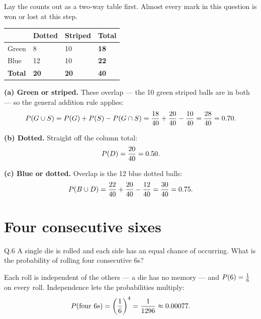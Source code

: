 \begin{solution}
Lay the counts out as a two-way table first. Almost every mark in this question
is won or lost at this step.

\begin{center}
\small\sffamily
\begin{tabular}{@{}l C{2.2cm} C{2.2cm} C{2.2cm}@{}}
\toprule
 & \textbf{Dotted} & \textbf{Striped} & \textbf{Total} \\
\midrule
Green & 8  & 10 & \textbf{18} \\
Blue  & 12 & 10 & \textbf{22} \\
\midrule
\textbf{Total} & \textbf{20} & \textbf{20} & \textbf{40} \\
\bottomrule
\end{tabular}
\end{center}

\textbf{(a) Green or striped.} These overlap --- the 10 green striped balls are
in both --- so the general addition rule applies:
\[
P\!\left(G\cup S\right)=P\!\left(G\right)+P\!\left(S\right)-P\!\left(G\cap S\right)
=\frac{18}{40}+\frac{20}{40}-\frac{10}{40}=\frac{28}{40}=0.70 .
\]

\textbf{(b) Dotted.} Straight off the column total:
\[
P\!\left(D\right)=\frac{20}{40}=0.50 .
\]

\textbf{(c) Blue or dotted.} Overlap is the 12 blue dotted balls:
\[
P\!\left(B\cup D\right)=\frac{22}{40}+\frac{20}{40}-\frac{12}{40}=\frac{30}{40}=0.75 .
\]


\end{solution}

\section{Four consecutive sixes}

\begin{question}{Q.6}
A single die is rolled and each side has an equal chance of occurring. What is
the probability of rolling four consecutive 6s?
\end{question}

\begin{solution}
Each roll is independent of the others --- a die has no memory --- and
$P\!\left(6\right)=\tfrac{1}{6}$ on every roll. Independence lets the probabilities
multiply:
\[
P\!\left(\text{four }6\text{s}\right)=\left(\frac{1}{6}\right)^{4}
=\frac{1}{1296}\approx 0.00077 .
\]

\end{solution}

